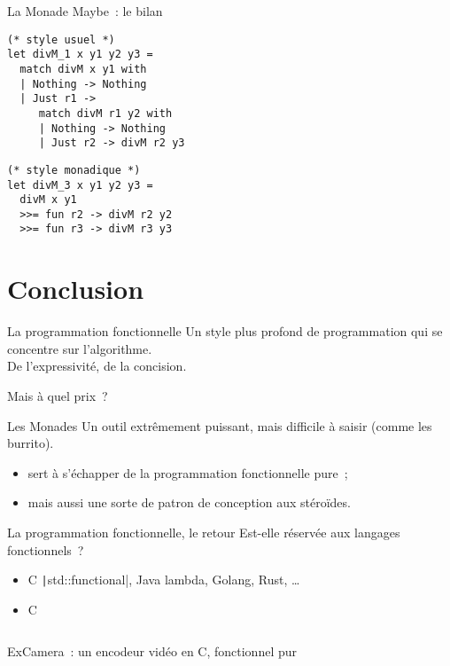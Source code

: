 \documentclass[10pt]{beamer}
\newcommand\CXX{C\nolinebreak[4]\hspace{-.05em}\raisebox{.4ex}{\relsize{-3}{\textbf{++}}}}
\begin{document}
\begin{frame}[fragile]{La Monade Maybe~: le bilan}
  \begin{multicols*}{2}
\begin{verbatim}
(* style usuel *)
let divM_1 x y1 y2 y3 =
  match divM x y1 with
  | Nothing -> Nothing
  | Just r1 ->
     match divM r1 y2 with
     | Nothing -> Nothing
     | Just r2 -> divM r2 y3
\end{verbatim}
    \columnbreak{}
\begin{verbatim}
(* style monadique *)
let divM_3 x y1 y2 y3 =
  divM x y1
  >>= fun r2 -> divM r2 y2
  >>= fun r3 -> divM r3 y3
\end{verbatim}
  \end{multicols*}
\end{frame}

\section{Conclusion}

\begin{frame}{La programmation fonctionnelle}
  Un style plus profond de programmation qui se concentre sur
  l'algorithme.\\
  De l'expressivité, de la concision.

  Mais à quel prix~?
\end{frame}

\begin{frame}{Les Monades}
  Un outil extrêmement puissant, mais difficile à saisir (comme les
  burrito).

  \begin{itemize}
  \item sert à s'échapper de la programmation fonctionnelle pure~;
  \item mais aussi une sorte de patron de conception aux stéroïdes.
  \end{itemize}
\end{frame}

\begin{frame}{La programmation fonctionnelle, le retour}
  Est-elle réservée aux langages fonctionnels~?
  \begin{itemize}
  \item \CXX{} \texttt|std::functional|, Java lambda, Golang, Rust, …
  \item C \inputminted{c}{./attributes.c}
  \end{itemize}

  ExCamera~\cite{fouladi2017encoding}: un encodeur vidéo en \CXX{},
  fonctionnel pur
\end{frame}

\begin{frame}[allowframebreaks]
  \nocite{*}
  \printbibliography{}
\end{frame}
\end{document}
